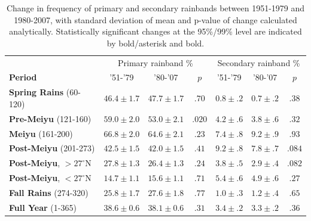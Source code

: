 \documentclass[final,grl]{agutexSI}
\begin{document}
\begin{table}

\centering

\caption{Change in frequency of primary and secondary rainbands between 1951-1979 and 1980-2007, with standard deviation of mean and p-value of change calculated analytically. Statistically significant changes at the 95\%/99\% level are indicated by bold/asterisk and bold.}

\begin{tabular}{ l c c c c c c}
	& \multicolumn{3}{c}{Primary rainband \%} & \multicolumn{3}{c}{Secondary rainband \%} \\
	\textbf{Period} & '51-'79 & '80-'07 & $p$ & '51-'79 & '80-'07 & $p$ \\
	\hline	
	\textbf{Spring Rains} (60-120)		& $46.4 \pm 1.7$ & $47.7 \pm 1.7$ & $ .70 $ 	& $0.8 \pm .2$ & $0.7 \pm .2$ & $.38$ \\
	\textbf{Pre-Meiyu} (121-160) 		& $\boldsymbol{59.0 \pm 2.0}$ & $\boldsymbol{53.0 \pm 2.1}$ & $ \boldsymbol{.020} $ & $4.2 \pm .6$ & $3.8 \pm .6$ & $.32$ \\
	\textbf{Meiyu} (161-200)			& $66.8 \pm 2.0$ & $64.6 \pm 2.1$ & $ .23 $ 	& $7.4 \pm .8$ & $9.2 \pm .9$  & $.93$ \\
	\textbf{Post-Meiyu} (201-273)		& $42.5 \pm 1.5$ & $42.0 \pm 1.5$ & $ .41 $	& $9.2 \pm .8$ & $7.8 \pm .7$ & $.084$ \\
	\textbf{Post-Meiyu}, $>27^\circ$N 	& $27.8 \pm 1.3$ & $26.4 \pm 1.3$ & $ .24 $ 	& $3.8 \pm .5$ & $2.9 \pm .4$ & $.082$ \\
	\textbf{Post-Meiyu}, $<27^\circ$N 	& $14.7 \pm 1.1 $ & $15.6 \pm 1.1$ & $ .71 $ 	& $5.4 \pm .6$ & $4.9 \pm .6$ & $.27$  \\
	\textbf{Fall Rains} (274-320)			& $25.8 \pm 1.7 $ & $27.6 \pm 1.8$ & $ .77 $ 	& $1.0 \pm .3$ & $1.2 \pm .4$ & $.65$ \\
	\textbf{Full Year} (1-365)			& $38.6 \pm 0.6 $ & $38.1 \pm 0.6$ & $ .31 $ 	& $3.4 \pm .2$ & $3.3 \pm .2$ & $.36$ \\

\end{tabular}
\label{ts5}
\end{table}
\end{document}
